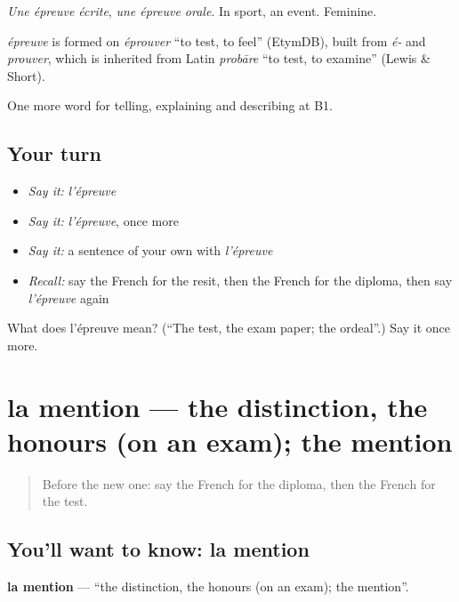 \emph{Une épreuve écrite}, \emph{une épreuve orale}. In sport, an event. Feminine.

\begin{cousinweb}
\emph{épreuve} is formed on \emph{éprouver} \textquotedblleft{}to test, to feel\textquotedblright{} (EtymDB), built from \emph{é-} and \emph{prouver}, which is inherited from Latin \emph{probāre} \textquotedblleft{}to test, to examine\textquotedblright{} (Lewis \& Short).
\end{cousinweb}

\begin{grammarlens}[title={What you've built}]
One more word for telling, explaining and describing at B1.
\end{grammarlens}

\subsection*{Your turn}
\begin{itemize}
\raggedright
  \item \emph{Say it:} \emph{l'épreuve}
  \item \emph{Say it:} \emph{l'épreuve}, once more
  \item \emph{Say it:} a sentence of your own with \emph{l'épreuve}
  \item \emph{Recall:} say the French for the resit, then the French for the diploma, then say \emph{l'épreuve} again
\end{itemize}

\begin{tcolorbox}[breakable,colback=teal!4,colframe=teal!35!black,title={Before you move on}]
What does l'épreuve mean? (\textquotedblleft{}The test, the exam paper; the ordeal\textquotedblright{}.) Say it once more.
\end{tcolorbox}
\section[la mention]{la mention — the distinction, the honours (on an exam); the mention}

\label{lesson:FR-C379-mention}



\begin{quote}
Before the new one: say the French for the diploma, then the French for the test.
\end{quote}

\subsection*{You'll want to know: la mention}
\textbf{la mention} — \textquotedblleft{}the distinction, the honours (on an exam); the mention\textquotedblright{}.

